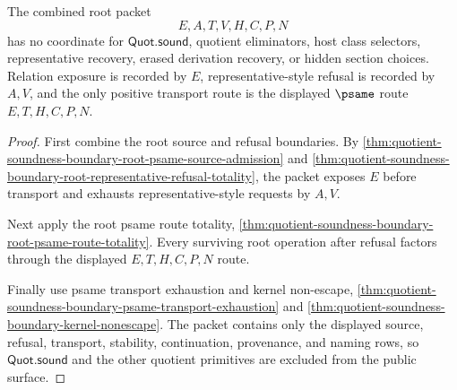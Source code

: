 \begin{theorem}
\label{thm:quotient-soundness-boundary-root-quotsound-exclusion}
The combined root packet
$$
E,A,T,V,H,C,P,N
$$
has no coordinate for $\mathsf{Quot.sound}$, quotient eliminators, host class selectors, representative recovery, erased derivation recovery, or hidden section choices. Relation exposure is recorded by $E$, representative-style refusal is recorded by $A,V$, and the only positive transport route is the displayed $\psame$ route $E,T,H,C,P,N$.
\end{theorem}
\begin{proof}
First combine the root source and refusal boundaries. By \autoref{thm:quotient-soundness-boundary-root-psame-source-admission} and \autoref{thm:quotient-soundness-boundary-root-representative-refusal-totality}, the packet exposes $E$ before transport and exhausts representative-style requests by $A,V$.

Next apply the root psame route totality, \autoref{thm:quotient-soundness-boundary-root-psame-route-totality}. Every surviving root operation after refusal factors through the displayed $E,T,H,C,P,N$ route.

Finally use psame transport exhaustion and kernel non-escape, \autoref{thm:quotient-soundness-boundary-psame-transport-exhaustion} and \autoref{thm:quotient-soundness-boundary-kernel-nonescape}. The packet contains only the displayed source, refusal, transport, stability, continuation, provenance, and naming rows, so $\mathsf{Quot.sound}$ and the other quotient primitives are excluded from the public surface.
\end{proof}

